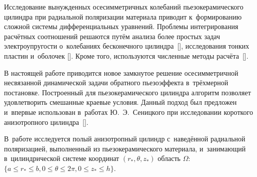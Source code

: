 

\date{12/X/2009} %




\maketitle






 Исследование вынужденных осесимметричных колебаний пьезокерамического цилиндра при радиальной поляризации материала приводит к~формированию сложной системы дифференциальных уравнений. 
Проблемы интегрирования расчётных соотношений решаются путём анализа более простых задач электроупругости о~колебаниях бесконечного цилиндра~[], исследования тонких пластин и~оболочек [].
Кроме того, используются численные методы расчёта~[].

В настоящей работе приводится новое замкнутое решение осесимметричной  несвязанной динамической задачи обратного пьезоэффекта в~трёхмерной постановке. Построенный для пьезокерамического цилиндра алгоритм позволяет удовлетворить смешанные краевые условия. 
Данный подход был предложен и~впервые использован в~работах Ю.~Э.~Сеницкого при исследовании короткого анизотропного цилиндра~[].

В~работе исследуется полый анизотропный цилиндр с~наведённой радиальной поляризацией, выполненный из пьезокерамического материала, и~занимающий в~цилиндрической системе  координат $(r_* , \theta, z_*  )$ область $\Omega $: 
$\{ a\le r_*  \le b, 0\le \theta \le 2\pi, 0\le z_*  \le h\}$. 

